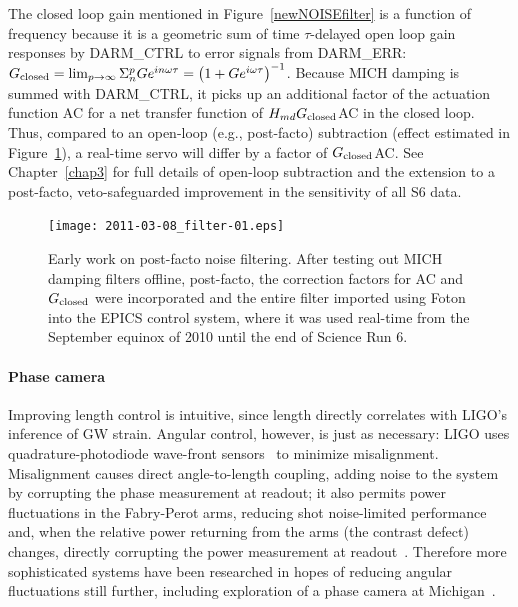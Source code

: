 The closed loop gain mentioned in Figure~\ref{newNOISEfilter} is a function of frequency because it is a geometric sum of time $\tau$-delayed open loop gain responses by DARM\_CTRL to error signals from DARM\_ERR: $G_\textup{closed} = \lim_{p\rightarrow\infty} \Sigma_n^p G e^{i n \omega \tau} = \left(1 + G e^{i \omega \tau} \right)^{-1}$. 
Because MICH damping is summed with DARM\_CTRL, it picks up an additional factor of the actuation function AC for a net transfer function of $H_{md} G_\textup{closed}$AC in the closed loop. 
Thus, compared to an open-loop (e.g., post-facto) subtraction (effect estimated in Figure~\ref{filter_early}), a real-time servo will differ by a factor of $G_\textup{closed}$AC. 
See Chapter~\ref{chap3} for full details of open-loop subtraction and the extension to a post-facto, veto-safeguarded improvement in the sensitivity of all S6 data.

	\begin{figure}
	\begin{center}
	\texttt{[image: 2011-03-08\_filter-01.eps]}
	\caption{Early work on post-facto noise filtering. After testing out MICH damping filters offline, post-facto, the correction factors for AC and $G_\textup{closed}$ were incorporated and the entire filter imported using Foton into the EPICS control system, where it was used real-time from the September equinox of 2010 until the end of Science Run 6.}
	\label{filter_early}
	\end{center}
	\end{figure}

                \paragraph{Phase camera}
                \label{phase_camera}

Improving length control is intuitive, since length directly correlates with LIGO's inference of GW strain.
Angular control, however, is just as necessary: LIGO uses quadrature-photodiode wave-front sensors~\cite{MavalvalaThesis} to minimize misalignment.
Misalignment causes direct angle-to-length coupling, adding noise to the system by corrupting the phase measurement at readout; it also permits power fluctuations in the Fabry-Perot arms, reducing shot noise-limited performance and, when the relative power returning from the arms (the contrast defect) changes, directly corrupting the power measurement at readout~\cite{DooleyThesis}.
Therefore more sophisticated systems have been researched in hopes of reducing angular fluctuations still further, including exploration of a phase camera at Michigan~\cite{DergachevThesis}.

